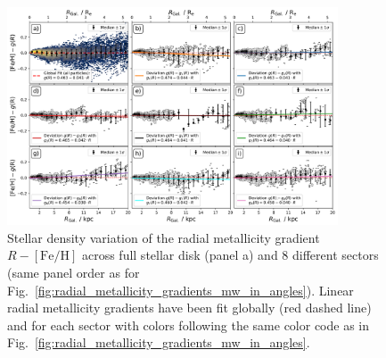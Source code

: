 \documentclass[fleqn,usenatbib]{mnras}
\begin{document}
\begin{figure}
    \centering
    \includegraphics[width=0.875\textwidth]{figures/linear_radial_metallicity_gradients_mw_in_angles.png}
    \caption{Stellar density variation of the radial metallicity gradient $R-\mathrm{[Fe/H]}$ across full stellar disk (panel a) and 8 different sectors (same panel order as for Fig.~\ref{fig:radial_metallicity_gradients_mw_in_angles}). Linear radial metallicity gradients have been fit globally (red dashed line) and for each sector with colors following the same color code as in Fig.~\ref{fig:radial_metallicity_gradients_mw_in_angles}.}    \label{fig:linear_radial_metallicity_gradients_mw_in_angles}
\end{figure}


\bsp	%
\label{lastpage}
\end{document}
